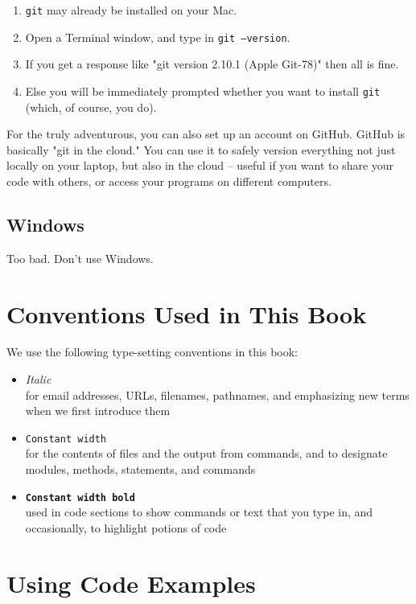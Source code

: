 \begin{enumerate} 
\item \texttt{git} may already be installed on your Mac.
\item Open a Terminal window, and type in \texttt{git --version}. 
\item If you get a response like "git version 2.10.1 (Apple Git-78)" then all is fine. 
\item Else you will be immediately prompted whether you want to install \texttt{git} (which, of course, you do). 
\end{enumerate} 

For the truly adventurous, you can also set up an account on GitHub. GitHub is basically "git in the cloud." You can use it to safely version everything not just locally on your laptop, but also in the cloud -- useful if you want to share your code with others, or access your programs on different computers.   

\subsection{Windows} 

Too bad. Don't use Windows. 

\section{Conventions Used in This Book}

We use the following type-setting conventions in this book:

\begin{itemize}
\item[]\textit{Italic}\\ for email addresses, URLs, filenames, pathnames, and emphasizing new terms when we first introduce them
\item[]\texttt{Constant width}\\ for the contents of files and the output from commands, and to designate modules, methods, statements, and commands
\item[]\textbf{\texttt{Constant width bold}}\\ used in code sections to show commands or text that you type in, and occasionally, to highlight potions of code 

\end{itemize}

\section{Using Code Examples}

